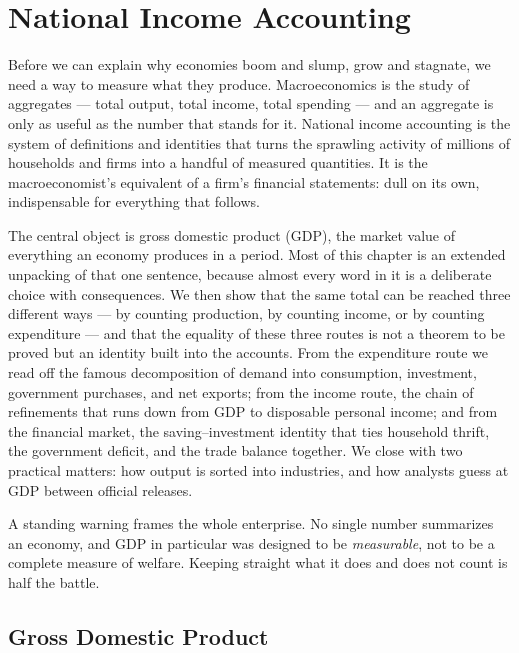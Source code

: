 \chapter{National Income Accounting}
\label{ch:accounts}

Before we can explain why economies boom and slump, grow and stagnate, we need a way to measure what they produce. Macroeconomics is the study of aggregates --- total output, total income, total spending --- and an aggregate is only as useful as the number that stands for it. National income accounting is the system of definitions and identities that turns the sprawling activity of millions of households and firms into a handful of measured quantities. It is the macroeconomist's equivalent of a firm's financial statements: dull on its own, indispensable for everything that follows.

The central object is gross domestic product (GDP), the market value of everything an economy produces in a period. Most of this chapter is an extended unpacking of that one sentence, because almost every word in it is a deliberate choice with consequences. We then show that the same total can be reached three different ways --- by counting production, by counting income, or by counting expenditure --- and that the equality of these three routes is not a theorem to be proved but an identity built into the accounts. From the expenditure route we read off the famous decomposition of demand into consumption, investment, government purchases, and net exports; from the income route, the chain of refinements that runs down from GDP to disposable personal income; and from the financial market, the saving--investment identity that ties household thrift, the government deficit, and the trade balance together. We close with two practical matters: how output is sorted into industries, and how analysts guess at GDP between official releases.

A standing warning frames the whole enterprise. No single number summarizes an economy, and GDP in particular was designed to be \emph{measurable}, not to be a complete measure of welfare. Keeping straight what it does and does not count is half the battle.

\section{Gross Domestic Product}


